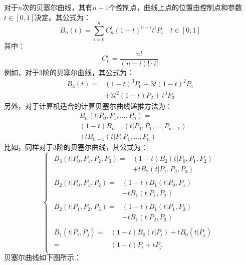\documentclass[12pt, twocolumn]{article}
\begin{document}
	对于$n$次的贝塞尔曲线，其有$n+1$个控制点，曲线上点的位置由控制点和参数$t\in[0,1]$决定。其公式为：
	\begin{equation*}
		B_n(t)=\sum_{i=0}^{n}C_{n}^{i}(1-t)^{n-i}t^{i}P_{i}\quad t\in[0,1]
	\end{equation*}
	其中：
	\begin{equation*}
		C_{n}^{i}=\frac{n!}{(n-i)!\cdot i!}
	\end{equation*}
	例如，对于3阶的贝塞尔曲线，其公式为：
	\begin{equation*}
		\begin{aligned}
			B_3(t)=&(1-t)^3P_0+3t(1-t)^2P_1\\&+3t^2(1-t)P_2+t^3P_3
		\end{aligned}
	\end{equation*}
另外，对于计算机适合的计算贝塞尔曲线递推方法为：
\begin{equation*}
	\begin{aligned}
			&B_n(t|P_0,P_1,\dots,P_n)=\\&(1-t)B_{n-1}(t|P_0,P_1,\dots,P_{n-1})\\
			&+tB_{n-1}(t|P,P_1,\dots,P_n)
	\end{aligned}
\end{equation*}
比如，同样对于3阶的贝塞尔曲线，其公式为：
\begin{equation*}
	\begin{cases}
		\begin{aligned}
			B_3(t|P_0,P_1,P_2,P_3)=&(1-t)B_2(t|P_0,P_1,P_2)\\&+tB_2(t|P_1,P_2,P_3)
		\end{aligned}\\
		\begin{aligned}
		B_2(t|P_0,P_1,P_2)=&(1-t)B_1(t|P_0,P_1)\\&+tB_1(t|P_1,P_2)
		\end{aligned}\\
	\begin{aligned}
	B_2(t|P_1,P_2,P_3)=&(1-t)B_1(t|P_1,P_2)\\&+tB_1(t|P_2,P_3)
	\end{aligned}\\
	\begin{aligned}
	B_1(t|P_i,P_j)=&(1-t)B_0(t|P_i)+tB_0(t|P_j)\\
	=&(1-t)P_i+tP_j
	\end{aligned}
	\end{cases}
\end{equation*}
贝塞尔曲线如下图所示：
\end{document}
